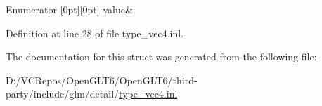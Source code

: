 \begin{DoxyEnumFields}{Enumerator}
[0pt][0pt]{}\mbox{\label{structglm_1_1detail_1_1is__int_3_01uint64_01_4_a8be9e204582a6cf6049dac4a685cb868a78866d286f2c5661c099f47ae16450cc}} 
value&\\
\hline

\end{DoxyEnumFields}


Definition at line 28 of file type\+\_\+vec4.\+inl.



The documentation for this struct was generated from the following file\+:\begin{DoxyCompactItemize}
\item 
D\+:/\+V\+C\+Repos/\+Open\+G\+L\+T6/\+Open\+G\+L\+T6/third-\/party/include/glm/detail/\mbox{\hyperlink{type__vec4_8inl}{type\+\_\+vec4.\+inl}}\end{DoxyCompactItemize}
